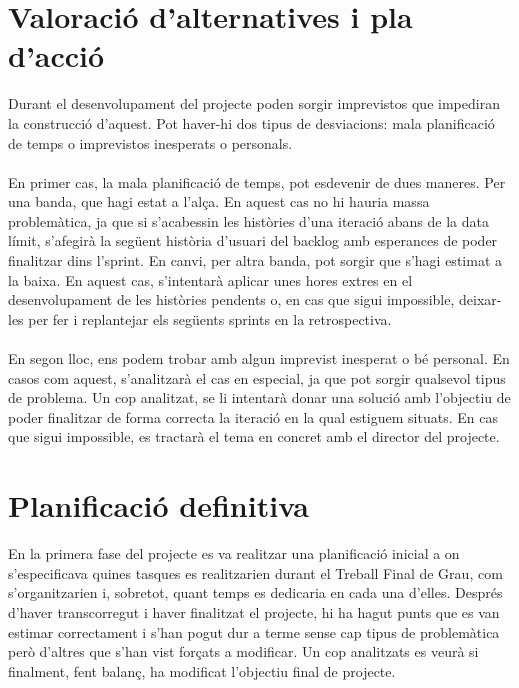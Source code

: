 
\section{Valoració d'alternatives i pla d'acció}

Durant el desenvolupament del projecte poden sorgir imprevistos que impediran la construcció d'aquest. Pot haver-hi dos tipus de desviacions: mala planificació de temps o imprevistos inesperats o personals.
\\\\
En primer cas, la mala planificació de temps, pot esdevenir de dues maneres. Per una banda, que hagi estat a l'alça. En aquest cas no hi hauria massa problemàtica, ja que si s'acabessin les històries d'una iteració abans de la data límit, s'afegirà la següent història d'usuari del backlog amb esperances de poder finalitzar dins l'sprint. En canvi, per altra banda, pot sorgir que s'hagi estimat a la baixa. En aquest cas, s'intentarà aplicar unes hores extres en el desenvolupament de les històries pendents o, en cas que sigui impossible, deixar-les per fer i replantejar els següents sprints en la retrospectiva.
\\\\
En segon lloc, ens podem trobar amb algun imprevist inesperat o bé personal. En casos com aquest, s'analitzarà el cas en especial, ja que pot sorgir qualsevol tipus de problema. Un cop analitzat, se li intentarà donar una solució amb l'objectiu de poder finalitzar de forma correcta la iteració en la qual estiguem situats. En cas que sigui impossible, es tractarà el tema en concret amb el director del projecte.


\section{Planificació definitiva}

En la primera fase del projecte es va realitzar una planificació inicial a on s'especificava quines tasques es realitzarien durant el Treball Final de Grau, com s'organitzarien i, sobretot, quant temps es dedicaria en cada una d'elles. Després d'haver transcorregut i haver finalitzat el projecte, hi ha hagut punts que es van estimar correctament i s'han pogut dur a terme sense cap tipus de problemàtica però d'altres que s'han vist forçats a modificar. Un cop analitzats es veurà si finalment, fent balanç, ha modificat l'objectiu final de projecte.


